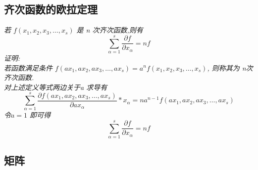 \documentclass{scrartcl}
\numberwithin{equation}{section}   %
\begin{document}
\subsection{齐次函数的欧拉定理}
\textsl{若 $f(x_1, x_2, x_3, \dots, x_s)$ 是 n 次齐次函数,则有 }
\begin{equation}\sum_{\alpha=1}^s{\frac{\partial  f}{\partial x_{\alpha}}} = nf\end{equation}
\textsl{证明:\\
    若函数满足条件 $f(ax_1, ax_2, ax_3, \dots, ax_s) = a^n f(x_1, x_2, x_3, \dots, x_s)$, 则称其为 n次齐次函数. \\对上述定义等式两边关于a 求导有}
\begin{equation}
    \sum_{\alpha=1}^s{\frac{\partial f(ax_1, ax_2, ax_3, \dots, ax_s)}{\partial ax_{\alpha}}
    * x_\alpha = n a^{n-1} f(ax_1, ax_2, ax_3, \dots, ax_s)}
\end{equation}
\textsl{令$a =1$ 即可得}
\begin{equation}\sum_{\alpha = 1}^s{\frac{\partial  f}{\partial x_{\alpha}}} = nf\end{equation}
\subsection{矩阵}
\end{document}
